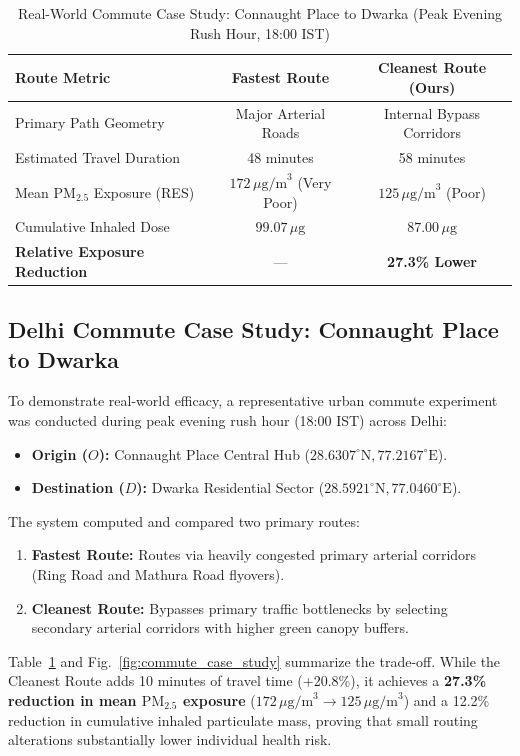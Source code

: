 \documentclass[journal]{IEEEtran}
\begin{document}
\begin{table}[!t]
\caption{Real-World Commute Case Study: Connaught Place to Dwarka (Peak Evening Rush Hour, 18:00 IST)}
\label{table:case_study}
\centering
\begin{tabular}{lcc}
\toprule
\textbf{Route Metric} & \textbf{Fastest Route} & \textbf{Cleanest Route (Ours)} \\
\midrule
Primary Path Geometry & Major Arterial Roads & Internal Bypass Corridors \\
Estimated Travel Duration & 48 minutes & 58 minutes \\
Mean $\text{PM}_{2.5}$ Exposure (RES) & $172\,\mu\text{g/m}^3$ (Very Poor) & $125\,\mu\text{g/m}^3$ (Poor) \\
Cumulative Inhaled Dose & $99.07\,\mu\text{g}$ & $87.00\,\mu\text{g}$ \\
\textbf{Relative Exposure Reduction} & --- & \textbf{27.3\% Lower} \\
\bottomrule
\end{tabular}
\end{table}

\subsection{Delhi Commute Case Study: Connaught Place to Dwarka}
To demonstrate real-world efficacy, a representative urban commute experiment was conducted during peak evening rush hour (18:00 IST) across Delhi:
\begin{itemize}
    \item \textbf{Origin ($O$):} Connaught Place Central Hub ($28.6307^\circ\text{N}, 77.2167^\circ\text{E}$).
    \item \textbf{Destination ($D$):} Dwarka Residential Sector ($28.5921^\circ\text{N}, 77.0460^\circ\text{E}$).
\end{itemize}

The system computed and compared two primary routes:
\begin{enumerate}
    \item \textbf{Fastest Route:} Routes via heavily congested primary arterial corridors (Ring Road and Mathura Road flyovers).
    \item \textbf{Cleanest Route:} Bypasses primary traffic bottlenecks by selecting secondary arterial corridors with higher green canopy buffers.
\end{enumerate}

Table~\ref{table:case_study} and Fig.~\ref{fig:commute_case_study} summarize the trade-off. While the Cleanest Route adds 10 minutes of travel time (+20.8\%), it achieves a \textbf{27.3\% reduction in mean $\text{PM}_{2.5}$ exposure} ($172\,\mu\text{g/m}^3 \to 125\,\mu\text{g/m}^3$) and a 12.2\% reduction in cumulative inhaled particulate mass, proving that small routing alterations substantially lower individual health risk.
\end{document}
